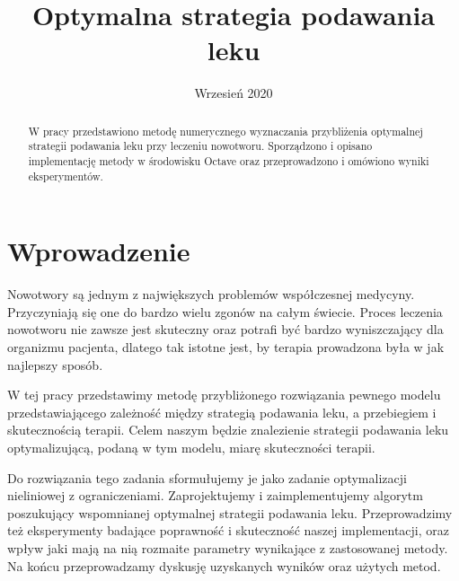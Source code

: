 \documentclass[licencjacka]{pracamgr}
\title{Optymalna strategia podawania leku}
\date{Wrzesień 2020}
\begin{document}
\maketitle

\begin{abstract}
  W pracy przedstawiono metodę numerycznego wyznaczania przybliżenia optymalnej strategii podawania leku przy leczeniu nowotworu.
  Sporządzono i opisano implementację metody w środowisku Octave oraz przeprowadzono i omówiono wyniki eksperymentów.
\end{abstract}

\tableofcontents

\chapter*{Wprowadzenie}

Nowotwory są jednym z największych problemów współczesnej medycyny. Przyczyniają się one do bardzo wielu zgonów na całym świecie. Proces leczenia nowotworu nie zawsze jest skuteczny oraz potrafi być bardzo wyniszczający dla organizmu pacjenta, dlatego tak istotne jest, by terapia prowadzona była w jak najlepszy sposób.

W tej pracy przedstawimy metodę przybliżonego rozwiązania pewnego modelu przedstawiającego zależność między strategią podawania leku, a przebiegiem i skutecznością terapii. Celem naszym będzie znalezienie strategii podawania leku optymalizującą, podaną w tym modelu, miarę skuteczności terapii.

Do rozwiązania tego zadania sformułujemy je jako zadanie optymalizacji nieliniowej z ograniczeniami. Zaprojektujemy i zaimplementujemy algorytm poszukujący wspomnianej optymalnej strategii podawania leku. Przeprowadzimy też eksperymenty badające poprawność i skuteczność naszej implementacji, oraz wpływ jaki mają na nią rozmaite parametry wynikające z zastosowanej metody. Na końcu przeprowadzamy dyskusję uzyskanych wyników oraz użytych metod.
\end{document}
